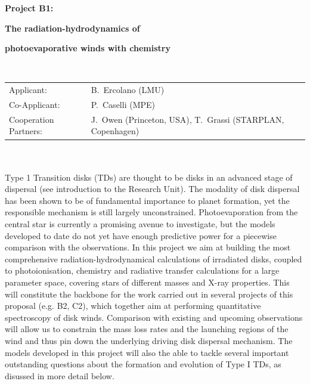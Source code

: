 \documentclass[10pt,fleqn,twoside]{article}
\begin{document}
\newpage


\setcounter{page}{1}

\centerline{\huge\bf\Tcol
%
%
%
%
%
 Project B1:}
\vspace{1em}

\centerline{\LARGE\bf\Tcol The radiation-hydrodynamics of}\vspace{0.3em}
\centerline{\LARGE\bf\Tcol photoevaporative winds with chemistry}

%
%
%
%
%
\vskip1.0cm

\\
\begin{tabular}{ll}
{\textsf{Applicant:}}           & B.~Ercolano (LMU)\\
{\textsf{Co-Applicant:}}        & P.~Caselli (MPE)\\
{\textsf{Cooperation Partners:}} & J.~Owen (Princeton, USA), T.~Grassi (STARPLAN, Copenhagen)  \
\end{tabular}


\vspace{1em}
 \\

\vspace{1em}
\\
Type 1 Transition disks (TDs) are thought to be disks in an advanced stage of dispersal
(see introduction to the Research Unit). The
modality of disk dispersal has been shown to be of fundamental importance to planet
formation, yet the responsible mechanism is still largely
unconstrained. Photoevaporation from the central star is currently a
promising avenue to investigate, but the models developed to date do
not yet have enough predictive power for a piecewise comparison with
the observations. In this project we aim at building the most
comprehensive radiation-hydrodynamical calculations of irradiated disks, 
coupled to photoionisation, chemistry and radiative transfer
calculations for a large parameter space, covering stars of different
masses and X-ray properties. This will constitute the backbone for the work carried
out in several projects of this proposal (e.g. B2, C2), which together
aim at performing quantitative
spectroscopy of disk winds. Comparison with existing and upcoming
observations will allow us to constrain the mass loss rates and the
launching regions of the wind and thus pin down the underlying driving disk
dispersal mechanism. 
The models developed in this project will also the able to tackle
several important outstanding questions about the formation and evolution of
Type I TDs, as disussed in more detail below. 
\end{document}
